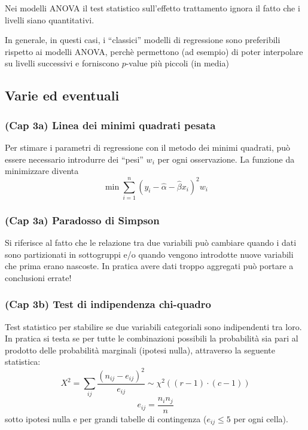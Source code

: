 \documentclass[
]{article}
\begin{document}
Nei modelli ANOVA il test statistico sull'effetto trattamento ignora il
fatto che i livelli siano quantitativi.

In generale, in questi casi, i ``classici'' modelli di regressione sono
preferibili rispetto ai modelli ANOVA, perchè permettono (ad esempio) di
poter interpolare su livelli successivi e forniscono \(p\)-value più
piccoli (in media)

\hypertarget{varie-ed-eventuali}{%
\subsection{Varie ed eventuali}\label{varie-ed-eventuali}}

\hypertarget{cap-3a-linea-dei-minimi-quadrati-pesata}{%
\subsubsection{(Cap 3a) Linea dei minimi quadrati
pesata}\label{cap-3a-linea-dei-minimi-quadrati-pesata}}

Per stimare i parametri di regressione con il metodo dei minimi
quadrati, può essere necessario introdurre dei ``pesi'' \(w_i\) per ogni
osservazione. La funzione da minimizzare diventa
\[\min \sum_{i=1}^n (y_i - \hat{\alpha} - \hat{\beta}x_i)^2w_i\]

\hypertarget{cap-3a-paradosso-di-simpson}{%
\subsubsection{(Cap 3a) Paradosso di
Simpson}\label{cap-3a-paradosso-di-simpson}}

Si riferisce al fatto che le relazione tra due variabili può cambiare
quando i dati sono partizionati in sottogruppi e/o quando vengono
introdotte nuove variabili che prima erano nascoste. In pratica avere
dati troppo aggregati può portare a conclusioni errate!

\hypertarget{cap-3b-test-di-indipendenza-chi-quadro}{%
\subsubsection{(Cap 3b) Test di indipendenza
chi-quadro}\label{cap-3b-test-di-indipendenza-chi-quadro}}

Test statistico per stabilire se due variabili categoriali sono
indipendenti tra loro. In pratica si testa se per tutte le combinazioni
possibili la probabilità sia pari al prodotto delle probabilità
marginali (ipotesi nulla), attraverso la seguente statistica:
\[ X^2 = \sum_{ij}\frac{(n_{ij} - e_{ij})^2}{e_{ij}} \sim \chi^2((r-1)\cdot(c-1)) \]
\[ e_{ij} = \frac{n_i n_j}{n}\] sotto ipotesi nulla e per grandi tabelle
di contingenza (\(e_{ij} \leq 5\) per ogni cella).
\end{document}
